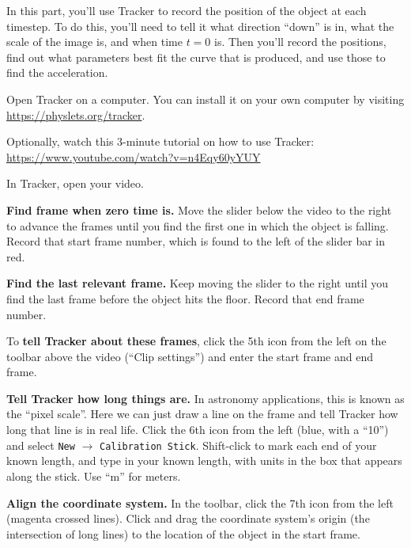 In this part, you'll use Tracker to record the position of the object at each timestep. To do this, you'll need to tell it what direction ``down'' is in, what the scale of the image is, and when time $t=0$ is. Then you'll record the positions, find out what parameters best fit the curve that is produced, and use those to find the acceleration.

\begin{steps}
	\item Open Tracker on a computer. You can install it on your own computer by visiting \url{https://physlets.org/tracker}.
	
	\item Optionally, watch this 3-minute tutorial on how to use Tracker: \url{https://www.youtube.com/watch?v=n4Eqy60yYUY}
	
	\item In Tracker, open your video.
	
	\item \textbf{Find frame when zero time is.} Move the slider below the video to the right to advance the frames until you find the first one in which the object is falling. Record that start frame number, which is found to the left of the slider bar in red.
	
	\item \textbf{Find the last relevant frame.} Keep moving the slider to the right until you find the last frame before the object hits the floor. Record that end frame number.
	
	\item To \textbf{tell Tracker about these frames}, click the 5th icon from the left on the toolbar above the video (``Clip settings'') and enter the start frame and end frame.
	
	\item \textbf{Tell Tracker how long things are.} In astronomy applications, this is known as the ``pixel scale''. Here we can just draw a line on the frame and tell Tracker how long that line is in real life. Click the 6th icon from the left (blue, with a ``10'') and select \texttt{New} $\rightarrow$ \texttt{Calibration Stick}. Shift-click to mark each end of your known length, and type in your known length, with units in the box that appears along the stick. Use ``m'' for meters.
	
	\item \textbf{Align the coordinate system.} In the toolbar, click the 7th icon from the left (magenta crossed lines). Click and drag the coordinate system's origin (the intersection of long lines) to the location of the object in the start frame.
	

\end{steps}

